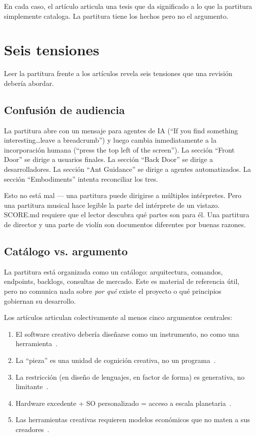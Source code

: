 \documentclass[10pt,letterpaper,twocolumn]{article}
\begin{document}
En cada caso, el art\'iculo articula una tesis que da significado a lo que la partitura simplemente cataloga. La partitura tiene los hechos pero no el argumento.

\section{Seis tensiones}

Leer la partitura frente a los art\'iculos revela seis tensiones que una revisi\'on deber\'ia abordar.

\subsection{Confusi\'on de audiencia}

La partitura abre con un mensaje para agentes de IA (``If you find something interesting\ldots leave a breadcrumb'') y luego cambia inmediatamente a la incorporaci\'on humana (``press the top left of the screen''). La secci\'on ``Front Door'' se dirige a usuarios finales. La secci\'on ``Back Door'' se dirige a desarrolladores. La secci\'on ``Ant Guidance'' se dirige a agentes automatizados. La secci\'on ``Embodiments'' intenta reconciliar los tres.

Esto no est\'a mal --- una partitura puede dirigirse a m\'ultiples int\'erpretes. Pero una partitura musical hace legible la parte del int\'erprete de un vistazo. SCORE.md requiere que el lector descubra qu\'e partes son para \'el. Una partitura de director y una parte de viol\'in son documentos diferentes por buenas razones.

\subsection{Cat\'alogo vs. argumento}

La partitura est\'a organizada como un cat\'alogo: arquitectura, comandos, endpoints, backlogs, consultas de mercado. Este es material de referencia \'util, pero no comunica nada sobre \emph{por qu\'e} existe el proyecto o qu\'e principios gobiernan su desarrollo.

Los art\'iculos articulan colectivamente al menos cinco argumentos centrales:
\begin{enumerate}
\item El software creativo deber\'ia dise\~narse como un instrumento, no como una herramienta~\citep{scudder2026goodiepal}.
\item La ``pieza'' es una unidad de cognici\'on creativa, no un programa~\citep{scudder2026pieces}.
\item La restricci\'on (en dise\~no de lenguajes, en factor de forma) es generativa, no limitante~\citep{scudder2026kidlisp, scudder2026cards}.
\item Hardware excedente + SO personalizado = acceso a escala planetaria~\citep{scudder2026os, scudder2026plork}.
\item Las herramientas creativas requieren modelos econ\'omicos que no maten a sus creadores~\citep{scudder2026sustainability}.
\end{enumerate}
\end{document}
